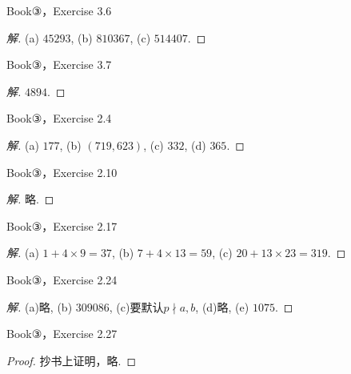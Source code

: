 \begin{exercise}
    Book③，Exercise 3.6
\end{exercise}
\begin{proof}[解]
    (a) $45293$, (b) $810367$, (c) $514407$.
\end{proof}

\begin{exercise}
    Book③，Exercise 3.7
\end{exercise}
\begin{proof}[解]
    $4894$.
\end{proof}

\begin{exercise}
    Book③，Exercise 2.4
\end{exercise}
\begin{proof}[解]
    (a) $177$, (b) $(719,623)$, (c) $332$, (d) $365$.
\end{proof}

\begin{exercise}
    Book③，Exercise 2.10
\end{exercise}
\begin{proof}[解]
    略.
\end{proof}

\begin{exercise}
    Book③，Exercise 2.17
\end{exercise}
\begin{proof}[解]
    (a) $1+4\times9=37$, (b) $7+4\times13=59$, (c) $20+13\times23=319$.
\end{proof}

\begin{exercise}
    Book③，Exercise 2.24
\end{exercise}
\begin{proof}[解]
    (a)略, (b) $309086$, (c)要默认$p\nmid a,b$, (d)略, (e) $1075$.
\end{proof}

\begin{exercise}
    Book③，Exercise 2.27
\end{exercise}
\begin{proof}
    抄书上证明，略.
\end{proof}

